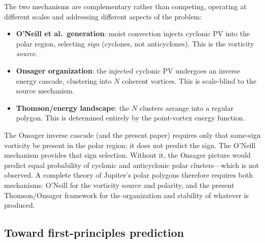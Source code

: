 The two mechanisms are complementary rather than competing, operating
at different scales and addressing different aspects of the problem:
\begin{itemize}
\item \textbf{O'Neill et al.\ generation}: moist convection injects
  cyclonic PV into the polar region, selecting \emph{sign} (cyclones,
  not anticyclones).  This is the vorticity \emph{source}.
\item \textbf{Onsager organization}: the injected cyclonic PV undergoes
  an inverse energy cascade, clustering into $N$ coherent vortices.
  This is scale-blind to the source mechanism.
\item \textbf{Thomson/energy landscape}: the $N$ clusters arrange into
  a regular polygon.  This is determined entirely by the point-vortex
  energy function.
\end{itemize}
The Onsager inverse cascade (and the present paper) requires only that
same-sign vorticity be present in the polar region; it does not predict
the sign.  The O'Neill mechanism provides that sign selection.  Without
it, the Onsager picture would predict equal probability of cyclonic and
anticyclonic polar clusters---which is not observed.  A complete theory
of Jupiter's polar polygons therefore requires both mechanisms:
O'Neill for the vorticity source and polarity, and the present
Thomson/Onsager framework for the organization and stability of
whatever is produced.

\subsection{Toward first-principles prediction}
\label{sec:first-principles}

